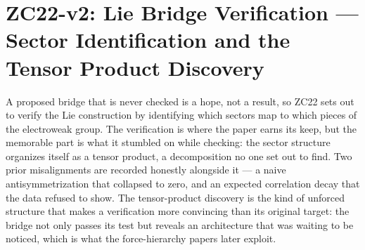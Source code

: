 \documentclass[12pt, a4paper]{article}
\begin{document}
\bigskip



\section{ZC22-v2: Lie Bridge Verification --- Sector Identification and the Tensor Product Discovery}
\label{sec:zc22-lie-verification}

A proposed bridge that is never checked is a hope, not a result, so ZC22 sets out
to verify the Lie construction by identifying which sectors map to which pieces
of the electroweak group. The verification is where the paper earns its keep, but
the memorable part is what it stumbled on while checking: the sector structure
organizes itself as a tensor product, a decomposition no one set out to find. Two
prior misalignments are recorded honestly alongside it --- a naive
antisymmetrization that collapsed to zero, and an expected correlation decay that
the data refused to show. The tensor-product discovery is the kind of unforced
structure that makes a verification more convincing than its original target: the
bridge not only passes its test but reveals an architecture that was waiting to
be noticed, which is what the force-hierarchy papers later exploit.
\end{document}
